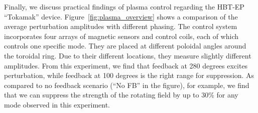 Finally, we discuss practical findings of plasma control regarding the
HBT-EP ``Tokamak'' device.
Figure~\ref{fig:plasma_overview} shows a comparison of the average
perturbation amplitudes with different phasing.
The control system incorporates four arrays of magnetic sensors and
control coils, each of which controls one specific mode.
They are placed at different poloidal angles around the toroidal ring.
Due to their different locations, they measure slightly different
amplitudes.
From this experiment, we find that feedback at 280 degrees excites
perturbation, while feedback at 100 degrees is the right range for
suppression.
As compared to no feedback scenario (``No FB'' in the figure), for
example, we find that we can suppress the strength of the rotating field
by up to 30\% for any mode observed in this experiment.